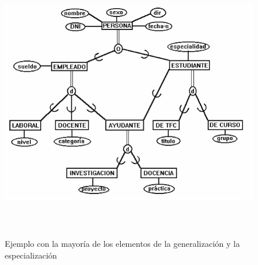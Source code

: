 \documentclass[12pt, titlepage]{article}
\begin{document}
    \begin{figure}[H]
        \begin{center}
            \includegraphics[width=15cm, height=12cm]{img/ejemplo.png}
            \caption{Ejemplo con la mayoría de los elementos de la generalización y la especialización}
            \label{fig:ejemplo}
        \end{center}
    \end{figure}
\end{document}
